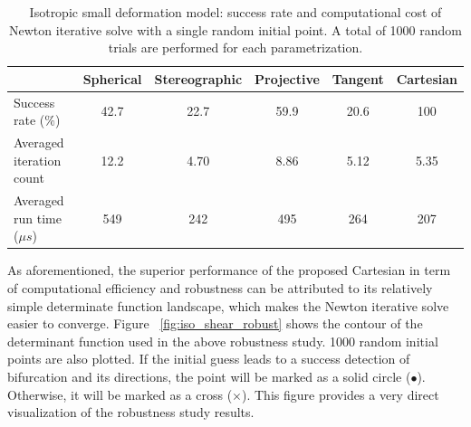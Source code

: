 \documentclass[12pt]{article}
\numberwithin{equation}{section}
\begin{document}
\begin{table}[H]
  \begin{center}
    \begin{tabular}{l | c c c c c}
      \toprule
       &  Spherical    &   Stereographic   & Projective   &   Tangent   &   Cartesian                 \\
      \midrule
      Success rate ($\%$)                      &    42.7    &    22.7    &    59.9     &    20.6     &   100          \\ 
      Averaged iteration count               &    12.2    &    4.70    &    8.86     &    5.12     &   5.35          \\
      Averaged run time (${\mu}s$)     &    549     &    242     &    495      &    264      &   207         \\
      \bottomrule
    \end{tabular}
    \caption{Isotropic small deformation model: success rate and computational cost of Newton iterative solve with a single random initial point. A total of 1000 random trials are performed for each parametrization.}
    \label{tab:iso_shear_random_para}
  \end{center}
\end{table}

As aforementioned, the superior performance of the proposed Cartesian 
in term of computational efficiency and robustness can be attributed 
to its relatively simple determinate function landscape, which makes 
the Newton iterative solve easier to converge. Figure~
\ref{fig:iso_shear_robust} shows the contour of the determinant 
function used in the above robustness  study. 1000 random initial 
points are also plotted. If the initial guess leads to a success 
detection of bifurcation and its directions, the point will be marked 
as a solid circle ($\bullet$). Otherwise, it will be marked as a cross 
($\times$). This figure provides a very direct visualization of the 
robustness study results. 
\end{document}
